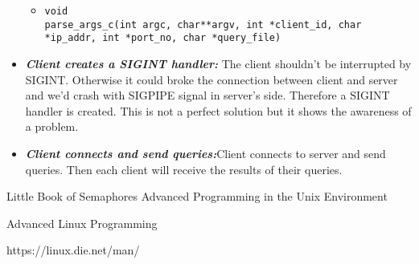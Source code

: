 \documentclass{article}
\begin{document}
\begin{itemize}
\begin{itemize}
    \item
    \begin{lstlisting}
void
parse_args_c(int argc, char**argv, int *client_id, char *ip_addr, int *port_no, char *query_file)
    \end{lstlisting}
\end{itemize}

\item \textbf{\textit{Client creates a SIGINT handler:}}
The client shouldn't be interrupted by SIGINT. Otherwise it could broke the connection between client and server and we'd crash with SIGPIPE signal in server's side. Therefore a SIGINT handler is created. This is not a perfect solution but it shows the awareness of a problem.
\item \textbf{\textit{Client connects and send queries:}}Client connects to server and send queries. Then each client will receive the results of their queries.



\end{itemize}






\pagebreak
\begin{thebibliography}{}
Little Book of Semaphores
Advanced Programming in the Unix Environment

\bibitem{}
Advanced Linux Programming

\bibitem{}
https://linux.die.net/man/

\end{thebibliography}
\end{document}
